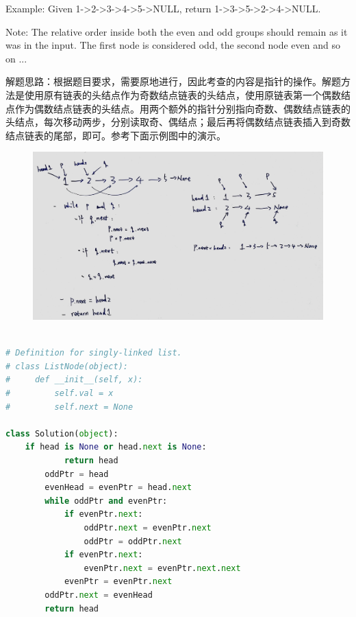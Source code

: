 \documentclass[a4paper,10pt]{article}
\begin{document}
\noindent Example: Given 1->2->3->4->5->NULL, return 1->3->5->2->4->NULL.

\noindent Note: The relative order inside both the even and odd groups should remain as it was in the input. The first node is considered odd, the second node even and so on ... \\

\begin{CJK*}{UTF8}{gbsn}
\noindent 解题思路：根据题目要求，需要原地进行，因此考查的内容是指针的操作。解题方法是使用原有链表的头结点作为奇数结点链表的头结点，使用原链表第一个偶数结点作为偶数结点链表的头结点。用两个额外的指针分别指向奇数、偶数结点链表的头结点，每次移动两步，分别读取奇、偶结点；最后再将偶数结点链表插入到奇数结点链表的尾部，即可。参考下面示例图中的演示。
\end{CJK*}

\begin{figure}[h]
    \includegraphics[width=\textwidth]{leetcode328.jpg}
    \centering \\
\end{figure}

\begin{lstlisting}[language=Python, caption=Problem328. Odd Even Linked List]

# Definition for singly-linked list.
# class ListNode(object):
#     def __init__(self, x):
#         self.val = x
#         self.next = None

class Solution(object):
    if head is None or head.next is None:
            return head
        oddPtr = head
        evenHead = evenPtr = head.next
        while oddPtr and evenPtr:
            if evenPtr.next:
                oddPtr.next = evenPtr.next
                oddPtr = oddPtr.next
            if evenPtr.next:
                evenPtr.next = evenPtr.next.next
            evenPtr = evenPtr.next
        oddPtr.next = evenHead
        return head
\end{lstlisting}
\end{document}

